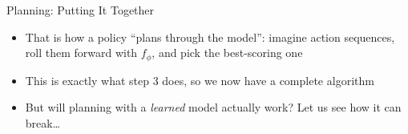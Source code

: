\begin{frame}{Planning: Putting It Together}
\begin{itemize}
    \item That is how a policy ``plans through the model'': imagine action
          sequences, roll them forward with $f_\phi$, and pick the best-scoring one
    \item This is exactly what step 3 does, so we now have a complete algorithm
    \item But will planning with a \emph{learned} model actually work? Let us see
          how it can break\ldots
\end{itemize}
\end{frame}

